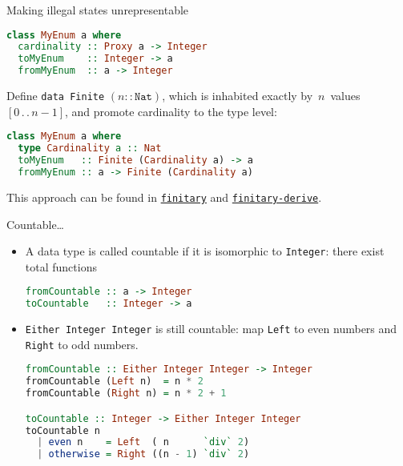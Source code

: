 \documentclass[handout]{beamer}
\def\dd{\,.\,.\,}
\begin{document}
\begin{frame}[fragile]{Making illegal states unrepresentable}

\begin{lstlisting}[language=Haskell]
class MyEnum a where
  cardinality :: Proxy a -> Integer
  toMyEnum    :: Integer -> a
  fromMyEnum  :: a -> Integer
\end{lstlisting}

\pause

Define {\tt data Finite} $(n :: \texttt{Nat})$, which is inhabited exactly by~$n$~values $[0\dd n-1]$,
and promote cardinality to the type level:

\begin{lstlisting}[language=Haskell]
class MyEnum a where
  type Cardinality a :: Nat
  toMyEnum   :: Finite (Cardinality a) -> a
  fromMyEnum :: a -> Finite (Cardinality a)
\end{lstlisting}

\pause

This approach can be found in \href{http://hackage.haskell.org/package/finitary}{\tt finitary} and \href{http://hackage.haskell.org/package/finitary-derive}{\tt finitary-derive}.

\end{frame}

\begin{frame}[fragile]{Countable\dots}

\begin{itemize}[<+->]

\item
A data type is called countable if it is isomorphic to {\tt Integer}: there exist total
functions

\begin{lstlisting}[language=Haskell]
fromCountable :: a -> Integer
toCountable   :: Integer -> a
\end{lstlisting}

\item
{\tt Either Integer Integer} is still countable: map {\tt Left} to even numbers
and {\tt Right} to odd numbers.

\begin{lstlisting}[language=Haskell]
fromCountable :: Either Integer Integer -> Integer
fromCountable (Left n)  = n * 2
fromCountable (Right n) = n * 2 + 1

toCountable :: Integer -> Either Integer Integer
toCountable n
  | even n    = Left  ( n      `div` 2)
  | otherwise = Right ((n - 1) `div` 2)
\end{lstlisting}

\end{itemize}

\end{frame}
\end{document}
